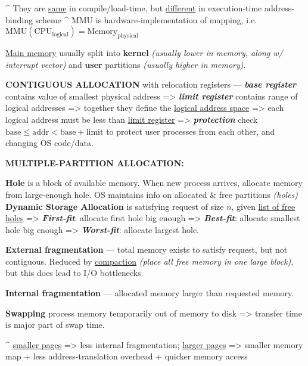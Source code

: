 \^{} They are \ul{same} in compile/load-time, but \ul{different} in execution-time address-binding scheme
\^{} MMU is hardware-implementation of mapping, i.e. $\mathrm{MMU}(\mathrm{CPU}_{\mathrm{logical}})=\mathrm{Memory}_{\mathrm{physical}}$

\vspace{+1.75pt}
\hSep

\ul{Main memory} usually split into \textbf{kernel} \textit{(usually lower in memory, along w/ interrupt vector)} and 
\textbf{user} partitions \textit{(usually higher in memory)}.

\textbf{CONTIGUOUS ALLOCATION} with relocation registers — 
\textit{\textbf{base register}} contains value of smallest physical address =>
\textit{\textbf{limit register}} contains range of logical addresses 
=> together they define the \ul{logical address space}
=> each logical address must be less than \ul{limit register} => 
\textit{\textbf{protection}} check \textcolor{cornellred}{$\mathrm{base} \leq \mathrm{addr} < \mathrm{base} + \mathrm{limit}$}
to protect user processes from each other, and changing OS code/data.

\textbf{MULTIPLE-PARTITION ALLOCATION:}
\begin{enumerate}
    \vItem \textbf{Hole} is a block of available memory. When new process arrives, allocate
    memory from large-enough hole.
    \vItem OS maintains info on allocated \& free partitions \textit{(holes)}
    \vItem \textbf{Dynamic Storage Allocation} is satisfying request of size $n$, given \ul{list of free holes} =>
    \textit{\textbf{First-fit}}: allocate first hole big enough =>
    \textit{\textbf{Best-fit}}: allocate smallest hole big enough =>
    \textit{\textbf{Worst-fit}}: allocate largest hole.
\end{enumerate}

\hSep

\textbf{External fragmentation} — total memory exists to
satisfy request, but not contiguous. Reduced by \ul{compaction} 
\textit{(place all free memory in one large block)}, 
but this does lead to I/O bottlenecks.

\textbf{Internal fragmentation} — allocated memory larger than requested memory.

\textbf{Swapping} process memory temporarily out of memory to disk => transfer time is major part of swap time.

\hSep


\^{} \ul{smaller pages} => less internal fragmentation; 
\ul{larger pages} => 
smaller memory map + less address-translation overhead
+ quicker memory access

